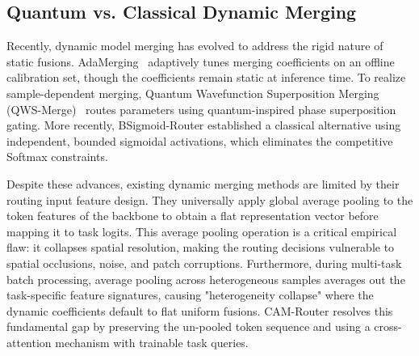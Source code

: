 \subsection{Quantum vs. Classical Dynamic Merging}
Recently, dynamic model merging has evolved to address the rigid nature of static fusions. AdaMerging~\cite{adamerging} adaptively tunes merging coefficients on an offline calibration set, though the coefficients remain static at inference time. To realize sample-dependent merging, Quantum Wavefunction Superposition Merging (QWS-Merge)~\cite{qwsmerge} routes parameters using quantum-inspired phase superposition gating. More recently, BSigmoid-Router established a classical alternative using independent, bounded sigmoidal activations, which eliminates the competitive Softmax constraints. 

Despite these advances, existing dynamic merging methods are limited by their routing input feature design. They universally apply global average pooling to the token features of the backbone to obtain a flat representation vector before mapping it to task logits. This average pooling operation is a critical empirical flaw: it collapses spatial resolution, making the routing decisions vulnerable to spatial occlusions, noise, and patch corruptions. Furthermore, during multi-task batch processing, average pooling across heterogeneous samples averages out the task-specific feature signatures, causing "heterogeneity collapse" where the dynamic coefficients default to flat uniform fusions. CAM-Router resolves this fundamental gap by preserving the un-pooled token sequence and using a cross-attention mechanism with trainable task queries.
